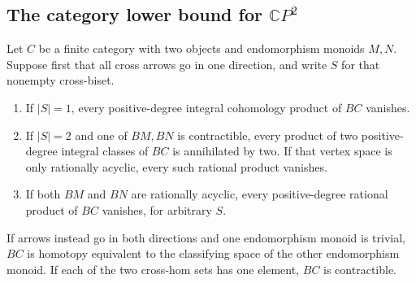 \subsection{The category lower bound for $\mathbb CP^2$}

\begin{lemma}
\label{C:two-object-cup-pruning}
Let $C$ be a finite category with two objects and endomorphism monoids
$M,N$. Suppose first that all cross arrows go in one direction, and
write $S$ for that nonempty cross-biset.
\begin{enumerate}
\item If $|S|=1$, every positive-degree integral cohomology product of
      $BC$ vanishes.
\item If $|S|=2$ and one of $BM,BN$ is contractible, every product of
      two positive-degree integral classes of $BC$ is annihilated by two.
      If that vertex space is only rationally acyclic, every such
      rational product vanishes.
\item If both $BM$ and $BN$ are rationally acyclic, every positive-degree
      rational product of $BC$ vanishes, for arbitrary $S$.
\end{enumerate}
If arrows instead go in both directions and one endomorphism monoid is
trivial, $BC$ is homotopy equivalent to the classifying space of the
other endomorphism monoid. If each of the two cross-hom sets has one
element, $BC$ is contractible.
\end{lemma}
